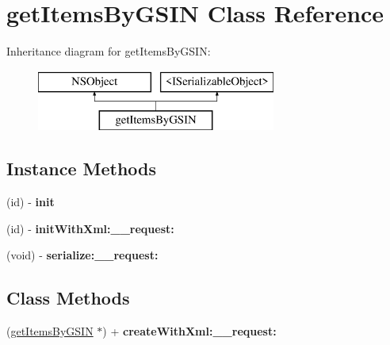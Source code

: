 \hypertarget{interfaceget_items_by_g_s_i_n}{}\section{get\+Items\+By\+G\+S\+I\+N Class Reference}
\label{interfaceget_items_by_g_s_i_n}
Inheritance diagram for get\+Items\+By\+G\+S\+I\+N\+:\begin{figure}[H]
\begin{center}
\leavevmode
\includegraphics[height=2.000000cm]{interfaceget_items_by_g_s_i_n}
\end{center}
\end{figure}
\subsection*{Instance Methods}
\begin{DoxyCompactItemize}
\item 
\hypertarget{interfaceget_items_by_g_s_i_n_ad921265921f8a89b02160da375278e9d}{}(id) -\/ {\bfseries init}\label{interfaceget_items_by_g_s_i_n_ad921265921f8a89b02160da375278e9d}

\item 
\hypertarget{interfaceget_items_by_g_s_i_n_aaa4e838cef808dc412ddeaee4898b9cf}{}(id) -\/ {\bfseries init\+With\+Xml\+:\+\_\+\+\_\+request\+:}\label{interfaceget_items_by_g_s_i_n_aaa4e838cef808dc412ddeaee4898b9cf}

\item 
\hypertarget{interfaceget_items_by_g_s_i_n_a7e70dfe4b4b1b2023696de7fe2e1a1a3}{}(void) -\/ {\bfseries serialize\+:\+\_\+\+\_\+request\+:}\label{interfaceget_items_by_g_s_i_n_a7e70dfe4b4b1b2023696de7fe2e1a1a3}

\end{DoxyCompactItemize}
\subsection*{Class Methods}
\begin{DoxyCompactItemize}
\item 
\hypertarget{interfaceget_items_by_g_s_i_n_a872d7192abc030c1a59f53e3bd105d58}{}(\hyperlink{interfaceget_items_by_g_s_i_n}{get\+Items\+By\+G\+S\+I\+N} $\ast$) + {\bfseries create\+With\+Xml\+:\+\_\+\+\_\+request\+:}\label{interfaceget_items_by_g_s_i_n_a872d7192abc030c1a59f53e3bd105d58}

\end{DoxyCompactItemize}
